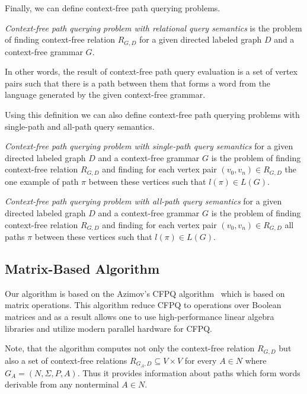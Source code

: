Finally, we can define context-free path querying problems.
\begin{definition}
    \emph{Context-free path querying problem with relational query semantics} is the problem of finding context-free relation $R_{G, D}$ for a given directed labeled graph $D$ and a context-free grammar $G$.
\end{definition}

In other words, the result of context-free path query evaluation is a set of vertex pairs such that there is a path between them that forms a word from the language generated by the given context-free grammar.

Using this definition we can also define context-free path querying problems with single-path and all-path query semantics.

\begin{definition}
	\emph{Context-free path querying problem with single-path query semantics} for a given directed labeled graph $D$ and a context-free grammar $G$ is the problem of finding context-free relation $R_{G, D}$ and finding for each vertex pair $(v_0, v_n) \in R_{G, D}$ the one example of path $\pi$ between these vertices such that $l(\pi) \in L(G)$.
\end{definition}

\begin{definition}
	\emph{Context-free path querying problem with all-path query semantics} for a given directed labeled graph $D$ and a context-free grammar $G$ is the problem of finding context-free relation $R_{G, D}$ and finding for each vertex pair $(v_0, v_n) \in R_{G, D}$ all paths $\pi$ between these vertices such that $l(\pi) \in L(G)$.
\end{definition}


\subsection{Matrix-Based Algorithm}
Our algorithm is based on the Azimov's CFPQ algorithm~\cite{Azimov:2018:CPQ:3210259.3210264} which is based on matrix operations.
This algorithm reduce CFPQ to operations over Boolean matrices and as a result allows one to use high-performance linear algebra libraries and utilize modern parallel hardware for CFPQ.

Note, that the algorithm computes not only the context-free relation $R_{G,D}$ but also a set of context-free relations $R_{G_A,D} \subseteq V \times V$ for every $A \in N$ where $G_A = (N, \Sigma, P, A)$.
Thus it provides information about paths which form words derivable from any nonterminal $A \in N$.

